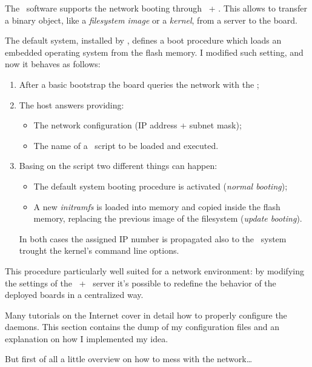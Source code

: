 The \uBoot\ software supports the network booting through \BootP\ + \TFTP.
This allows to transfer a binary object, like a \emph{filesystem image} or
a \emph{kernel}, from a server to the board.

The default system, installed by , defines a boot
procedure which loads an embedded operating system from the flash memory.
I modified such setting, and now it behaves as follows:

\begin{enumerate}

\item   After a basic bootstrap the board queries the network with the
        ;

\item   The host answers providing:
    \begin{itemize}
    \item   The network configuration (IP address + subnet mask);
    \item   The name of a \uBoot\ script to be loaded and executed.
    \end{itemize}

\item   Basing on the script two different things can happen:
    \begin{itemize}
    \item   The default system booting procedure is activated
            (\emph{normal booting});
    \item   A new \emph{initramfs} is loaded into memory and copied inside
            the flash memory, replacing the previous image of the
            filesystem (\emph{update booting}).
    \end{itemize}
    In both cases the assigned IP number is propagated also to the \Linux\
    system trought the kernel's command line options.

\end{enumerate}

This procedure particularly well suited for a network environment: by
modifying the settings of the \BootP\ + \TFTP\ server it's possible to
redefine the behavior of the deployed boards in a centralized way.

Many tutorials on the Internet cover in detail how to properly configure
the daemons. This section contains the dump of my configuration files and
an explanation on how I implemented my idea.

But first of all a little overview on how to mess with the network\dots

